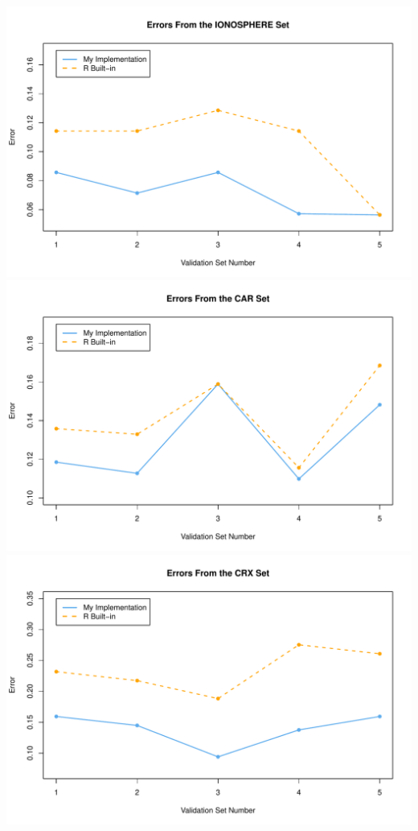 \documentclass{article}
\begin{document}
\begin{center}
    \includegraphics[width=0.9\linewidth]{Images/Prob3/Prob3-3-Iono.pdf}
    \includegraphics[width=0.9\linewidth]{Images/Prob3/Prob3-3-Car.pdf}
    \includegraphics[width=0.9\linewidth]{Images/Prob3/Prob3-3-Crx.pdf}
\end{center}
\end{document}
